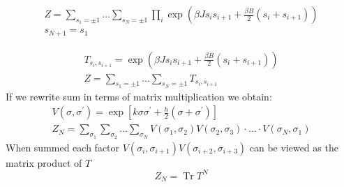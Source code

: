 \begin{prb}
	\begin{equation}
		\begin{aligned}
			Z=\sum_{s_{1}=\pm 1} \ldots \sum_{s_{N}=\pm 1} \prod_{i} \exp \left(\beta J s_{i} s_{i+1}+\frac{\beta B}{2}\left(s_{i}+s_{i+1}\right)\right) \\
			s_{N+1} = s_{1}
		\end{aligned}
	\end{equation}
\end{prb}
\begin{sol}
	\begin{equation}
		\begin{aligned}
			T_{s_{i}, s_{i+1}}=\exp \left(\beta J s_{i} s_{i+1}+\frac{\beta B}{2}\left(s_{i}+s_{i+1}\right)\right)\\
			Z=\sum_{s_{1}=\pm 1} \ldots \sum_{s_{N}=\pm 1} T_{s_{i}, s_{i+1}}
		\end{aligned}
	\end{equation}
	If we rewrite sum in terms of matrix multiplication we obtain:
	\begin{equation}
		\begin{aligned}
				V\left(\sigma, \sigma^{\prime}\right)=\exp \left[k \sigma \sigma^{\prime}+\frac{h}{2}\left(\sigma+\sigma^{\prime}\right)\right] \\
				Z_{N}=\sum_{\sigma_{1}} \sum_{\sigma_{2}} \ldots \sum_{\sigma_{N}} V\left(\sigma_{1}, \sigma_{2}\right) V\left(\sigma_{2}, \sigma_{3}\right) \cdot \ldots \cdot V\left(\sigma_{N}, \sigma_{1}\right)
		\end{aligned}
	\end{equation}
	When summed each factor $V\left(\sigma_{i}, \sigma_{i+1}\right) V\left(\sigma_{i+2}, \sigma_{i+3}\right)$ can be viewed as the matrix product of $T$
	\begin{equation}
		Z_{N} = \operatorname{Tr}T^{N}
	\end{equation}	
\end{sol}